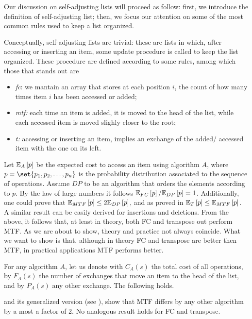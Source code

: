 \documentclass{subfiles}
\begin{document}
    Our discussion on self-adjusting lists will proceed as follow: 
        first, we introduce the definition of self-adjusting list;
        then, we focus our attention on some of the most common rules used to keep a list organized.

    Conceptually, self-adjusting lists are trivial:
        these are lists in which, after accessing or inserting an item, 
        some update procedure is called to keep the list organized.
        These procedure are defined according to some rules,
        among which those that stands out are 
        \begin{itemize}
            \item \emph{\gls{fc}}: we mantain an array that stores at each position \(i\),
                the count of how many times item \(i\) has been accessed or added;
            \item \emph{\gls{mtf}:} each time an item is added, it is moved to the head of the list,
                while each accessed item is moved slighly closer to the root;
            \item \emph{\gls{t}:} accessing or inserting an item, implies an exchange of the added/%
                accessed item with the one on its left.
        \end{itemize}
    
    Let \(\E{A}\) be the expected cost to access an item using algorithm \(A\), 
        where \(p = \set{p_{1}, p_{2}, \ldots, p_{n}}\) is the probability distribution associated
        to the sequence of operations. Assume \(DP\) to be an algorithm that 
        orders the elements according to \(p\). By the law of large numbers it follows \(\E{FC}/\E{DP} = 1\).
        Additionally, one could prove that \(\E{MTF} \le 2 \E{DP}\),
        and as proved in \cite{Rivest1976} \(\E{T} \le \E{MTF}\). 
        A similar result can be easily derived for insertions and deletions.
        From the above, it follows that, at least in theory, 
        both FC and transpose out perform MTF. As we are about to show, theory and practice not always coincide.
        What we want to show is that, although in theory FC and transpose are better then MTF,
        in practical applications MTF performs better.
        
    For any algorithm \(A\), let us denote with \(C_{A}(s)\) the total cost of all operations,
        by \(F_{A}(s)\) the number of exchanges that move an item to the head of the list,
        and by \(P_{A}(s)\) any other exchange. The following holds.

     and its generalized version (see \cite[Theorem 2.]{SleatorT1985}),
    show that MTF differs by any other algorithm by a most a factor of 2. No analogous result 
    holds for FC and transpose.
\end{document}

